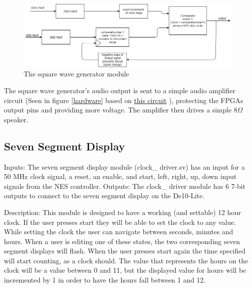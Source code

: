 \documentclass[a4paper]{article}
\begin{document}
\begin{figure}[H]
    \includegraphics[width=0.8 \linewidth]{images/sqwave.JPG}
    \caption{The square wave generator module}
    \label{sqwave}
\end{figure}

The square wave generator's audio output is sent to a simple audio amplifier circuit (Seen in figure \ref{hardware} based on \href{https://www.instructables.com/id/Tales-From-the-Chip-LM386-Audio-Amplifier/}{this circuit} ), protecting the FPGAs output pins and providing more voltage. The amplifier then drives a simple 8$\Omega$ speaker. 

\subsection{Seven Segment Display}
Inputs: The seven segment display module (clock\_ driver.sv) has an input for a 50 MHz clock signal, a reset, an enable, and start, left, right, up, down input signals from the NES controller.
Outputs: The clock\_ driver module has 6 7-bit outputs to connect to the seven segment display on the De10-Lite.

Description: This module is designed to have a working (and settable) 12 hour clock. If the user presses start they will be able to set the clock to any value. While setting the clock the user can navigate between seconds, minutes and hours. When a user is editing one of these states, the two corresponding seven segment displays will flash. When the user presses start again the time specified will start counting, as a clock should. The value that represents the hours on the clock will be a value between 0 and 11, but the displayed value for hours will be incremented by 1 in order to have the hours fall between 1 and 12. 
\end{document}
